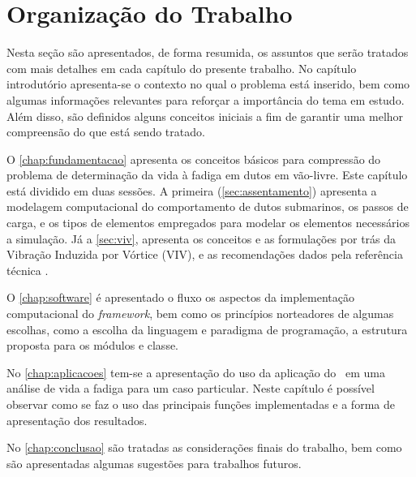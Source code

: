 \section{Organização do Trabalho}

Nesta seção são apresentados, de forma resumida, os assuntos que serão tratados com mais detalhes em cada capítulo do presente trabalho. No capítulo introdutório apresenta-se o contexto no qual o problema está inserido, bem como algumas informações relevantes para reforçar a importância do tema em estudo. Além disso, são definidos alguns conceitos iniciais a fim de garantir uma melhor compreensão do que está sendo tratado.

O \autoref{chap:fundamentacao} apresenta os conceitos básicos para compressão do problema de determinação da vida à fadiga em dutos em vão-livre. Este capítulo está dividido em duas sessões. A primeira (\autoref{sec:assentamento}) apresenta a modelagem computacional do comportamento de dutos submarinos, os passos de carga, e os tipos de elementos empregados para modelar os elementos necessários a simulação. Já a \autoref{sec:viv}, apresenta os conceitos e as formulações por trás da Vibração Induzida por Vórtice (VIV), e as recomendações dados pela referência técnica .

O \autoref{chap:software} é apresentado o fluxo  os aspectos da implementação computacional do \textit{framework}, bem como os princípios norteadores de algumas escolhas, como a escolha da linguagem e paradigma de programação, a estrutura proposta para os módulos e classe.

No \autoref{chap:aplicacoes} tem-se a apresentação do uso da aplicação do \frame\ em uma análise de vida a fadiga para um caso particular. Neste capítulo é possível observar como se faz o uso das principais funções implementadas e a forma de apresentação dos resultados.

No \autoref{chap:conclusao} são tratadas as considerações finais do trabalho, bem como são apresentadas algumas sugestões para trabalhos futuros.